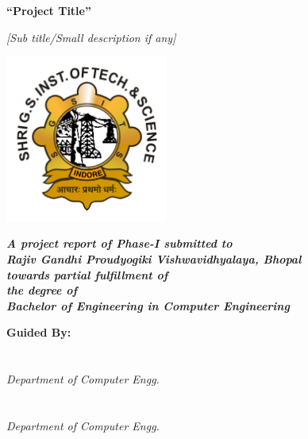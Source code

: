 \begin{titlepage}
    \centering
    \LARGE
    \textbf{``Project Title''}
    
    \Large
    \textit{[Sub title/Small description if any]}
    
    \vspace*{0.7cm}
    
    \includegraphics[width=0.4\textwidth]{images/logo.png}
    
    \vspace*{0.7cm}
    
    \textit{\textbf{A project report of Phase-I submitted to\\
    Rajiv Gandhi Proudyogiki Vishwavidhyalaya, Bhopal \\
    towards partial fulfillment of \\
    the degree of \\ 
    Bachelor of Engineering in Computer Engineering}}
    
    
    \vspace*{\fill}
    \large
    \begin{minipage}[t]{0.45\textwidth}
    \flushleft
    \textbf{Guided By:\\}
    \guide \\
    \desigGuide \\
    \emph{Department of Computer Engg.} \\
    \vspace*{0.5cm}
    \coguide \\
    \desigCoGuide \\
    \emph{Department of Computer Engg.} \\
    \end{minipage}
    \hfill
    \begin{minipage}[t]{0.45\textwidth}
    

\end{minipage}
\end{titlepage}
